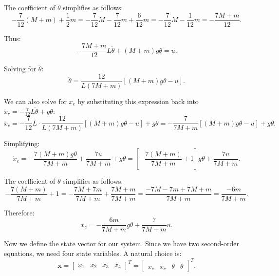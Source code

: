 The coefficient of $\ddot{\theta}$ simplifies as follows:
\begin{equation}
-\frac{7}{12}(M + m) + \frac{1}{2}m = -\frac{7}{12}M - \frac{7}{12}m + \frac{6}{12}m = -\frac{7}{12}M - \frac{1}{12}m = -\frac{7M + m}{12}.
\end{equation}

Thus:
\begin{equation}
-\frac{7M + m}{12}L\ddot{\theta} + (M + m)g\theta = u.
\end{equation}

Solving for $\ddot{\theta}$:
\begin{equation}
\ddot{\theta} = \frac{12}{L(7M + m)}\left[(M + m)g\theta - u\right].
\end{equation}

We can also solve for $\ddot{x}_c$ by substituting this expression back into $\ddot{x}_c = - \frac{7}{12}L\ddot{\theta} + g\theta$:
\begin{equation}
\ddot{x}_c = - \frac{7}{12}L \cdot \frac{12}{L(7M + m)}\left[(M + m)g\theta - u\right] + g\theta = - \frac{7}{7M + m}\left[(M + m)g\theta - u\right] + g\theta.
\end{equation}

Simplifying:
\begin{equation}
\ddot{x}_c = -\frac{7(M + m)g\theta}{7M + m} + \frac{7u}{7M + m} + g\theta = \left[-\frac{7(M + m)}{7M + m} + 1\right]g\theta + \frac{7u}{7M + m}.
\end{equation}

The coefficient of $\theta$ simplifies as follows:
\begin{equation}
-\frac{7(M + m)}{7M + m} + 1 = -\frac{7M + 7m}{7M + m} + \frac{7M + m}{7M + m} = \frac{-7M - 7m + 7M + m}{7M + m} = \frac{-6m}{7M + m}.
\end{equation}

Therefore:
\begin{equation}
\ddot{x}_c = -\frac{6m}{7M + m}g\theta + \frac{7}{7M + m}u.
\end{equation}

Now we define the state vector for our system. Since we have two second-order equations, we need four state variables. A natural choice is:
\begin{equation}
\mathbf{x} = \begin{bmatrix} x_1 & x_2 & x_3 & x_4 \end{bmatrix}^T = \begin{bmatrix} x_c & \dot{x}_c & \theta & \dot{\theta} \end{bmatrix}^T.
\end{equation}


